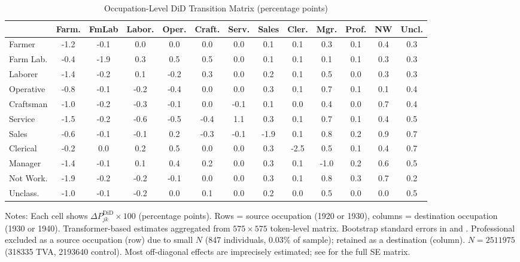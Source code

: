 \documentclass[12pt]{article}
\begin{document}
\begin{table}[H]
\centering
\caption{Occupation-Level DiD Transition Matrix (percentage points)}
\label{tab:did_matrix}
\begin{adjustbox}{max width=\textwidth}
\begin{threeparttable}
\begin{tabular}{l*{12}{S[table-format=-1.1,table-auto-round]}}
\toprule
& {Farm.} & {FmLab} & {Labor.} & {Oper.} & {Craft.} & {Serv.} & {Sales} & {Cler.} & {Mgr.} & {Prof.} & {NW} & {Uncl.} \\
\midrule
Farmer     & -1.2 & -0.1 &  0.0 &  0.0 &  0.0 &  0.0 & 0.1 & 0.1 & 0.3 & 0.1 & 0.4 & 0.3 \\
Farm Lab.  & -0.4 & -1.9 &  0.3 &  0.5 &  0.5 &  0.0 & 0.1 & 0.1 & 0.1 & 0.1 & 0.3 & 0.3 \\
Laborer    & -1.4 & -0.2 &  0.1 & -0.2 &  0.3 &  0.0 & 0.2 & 0.1 & 0.5 & 0.0 & 0.3 & 0.3 \\
Operative  & -0.8 & -0.1 & -0.2 & -0.4 &  0.0 &  0.0 & 0.3 & 0.1 & 0.7 & 0.1 & 0.1 & 0.4 \\
Craftsman  & -1.0 & -0.2 & -0.3 & -0.1 &  0.0 & -0.1 & 0.1 & 0.0 & 0.4 & 0.0 & 0.7 & 0.4 \\
Service    & -1.5 & -0.2 & -0.6 & -0.5 & -0.4 &  1.1 & 0.3 & 0.1 & 0.7 & 0.1 & 0.4 & 0.5 \\
Sales      & -0.6 & -0.1 & -0.1 &  0.2 & -0.3 & -0.1 &-1.9 & 0.1 & 0.8 & 0.2 & 0.9 & 0.7 \\
Clerical   & -0.2 &  0.0 &  0.2 &  0.5 &  0.0 &  0.0 & 0.3 &-2.5 & 0.5 & 0.1 & 0.4 & 0.7 \\
Manager    & -1.4 & -0.1 &  0.1 &  0.4 &  0.2 &  0.0 & 0.3 & 0.1 &-1.0 & 0.2 & 0.6 & 0.5 \\
Not Work.  & -1.9 & -0.2 & -0.2 & -0.1 &  0.0 &  0.0 & 0.3 & 0.1 & 0.8 & 0.3 & 0.7 & 0.2 \\
Unclass.   & -1.0 & -0.1 & -0.2 &  0.0 &  0.1 &  0.0 & 0.2 & 0.0 & 0.5 & 0.0 & 0.0 & 0.5 \\
\bottomrule
\end{tabular}
\begin{tablenotes}[flushleft]
\small
\item Notes: Each cell shows $\Delta P_{jk}^{\text{DiD}} \times 100$ (percentage points). Rows = source occupation (1920 or 1930), columns = destination occupation (1930 or 1940). Transformer-based estimates aggregated from $575 \times 575$ token-level matrix. Bootstrap standard errors in  and . Professional excluded as a source occupation (row) due to small $N$ (847 individuals, 0.03\% of sample); retained as a destination (column). $N = \num{2511975}$ (\num{318335} TVA, \num{2193640} control). Most off-diagonal effects are imprecisely estimated; see  for the full SE matrix.
\end{tablenotes}
\end{threeparttable}
\end{adjustbox}
\end{table}
\end{document}
